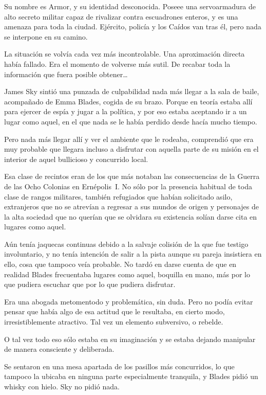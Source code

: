 \begin{prev}
    Su nombre es Armor, y su identidad desconocida. Poseee una servoarmadura de alto secreto militar capaz de rivalizar contra escuadrones enteros, y es una amenaza para toda la ciudad. Ejército, policía y los Caídos van tras él, pero nada se interpone en su camino.
\end{prev}

\noindent
La situación se volvía cada vez más incontrolable. Una aproximación directa había fallado. Era el momento de volverse más sutil. De recabar toda la información que fuera posible obtener\dots

\bigskip\noindent
James Sky sintió una punzada de culpabilidad nada más llegar a la sala de baile, acompañado de Emma Blades, cogida de su brazo. Porque en teoría estaba allí para ejercer de espía y jugar a la política, y por eso estaba aceptando ir a un lugar como aquel, en el que nada se le había perdido desde hacía mucho tiempo.

Pero nada más llegar allí y ver el ambiente que le rodeaba, comprendió que era muy probable que llegara incluso a disfrutar con aquella parte de su misión en el interior de aquel bullicioso y concurrido local.

Esa clase de recintos eran de los que más notaban las consecuencias de la Guerra de las Ocho Colonias en Ernépolis~I. No sólo por la presencia habitual de toda clase de rangos militares, también refugiados que habían solicitado asilo, extranjeros que no se atrevían a regresar a sus mundos de origen y personajes de la alta sociedad que no querían que se olvidara su existencia solían darse cita en lugares como aquel.

Aún tenía jaquecas continuas debido a la salvaje colisión de la que fue testigo involuntario, y no tenía intención de salir a la pista aunque su pareja insistiera en ello, cosa que tampoco veía probable. No tardó en darse cuenta de que en realidad Blades frecuentaba lugares como aquel, boquilla en mano, más por lo que pudiera escuchar que por lo que pudiera disfrutar.

Era una abogada metomentodo y problemática, sin duda. Pero no podía evitar pensar que había algo de esa actitud que le resultaba, en cierto modo, irresistiblemente atractivo. Tal vez un elemento subversivo, o rebelde.

O tal vez todo eso sólo estaba en su imaginación y se estaba dejando manipular de manera consciente y deliberada.

Se sentaron en una mesa apartada de los pasillos más concurridos, lo que tampoco la ubicaba en ninguna parte especialmente tranquila, y Blades pidió un whisky con hielo. Sky no pidió nada.

